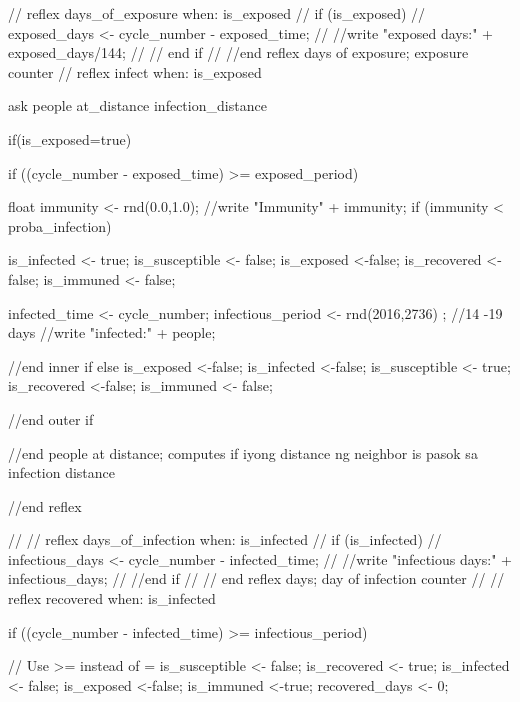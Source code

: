 \begin{verbatimtab}[4]
{{    //		reflex days_of_exposure when: is_exposed {
    //			if (is_exposed){
    //		   		exposed_days <- cycle_number - exposed_time;
    //		   		//write "exposed days:" + exposed_days/144;
    //		   	}// end if	
    //		}//end reflex days of exposure; exposure counter 
    //			
            reflex infect when: is_exposed {
                ask people at_distance infection_distance {
                    if(is_exposed=true){
                        if ((cycle_number - exposed_time) >= exposed_period){
                        float immunity <- rnd(0.0,1.0);
                        //write "Immunity" + immunity;
                        if (immunity < proba_infection) {
                            is_infected <- true;
                            is_susceptible <- false;
                            is_exposed <-false;
                            is_recovered <-false;
                            is_immuned <- false;
                            
                            infected_time <- cycle_number;
                            infectious_period <- rnd(2016,2736) ; //14 -19  days
                            //write "infected:" + people;
                        }//end inner if
                        else {
                            is_exposed <-false;
                            is_infected <-false;
                            is_susceptible <- true;
                            is_recovered <-false;
                            is_immuned <- false; 
                        }
                    }//end outer if	
                    }
                    
                    
                }//end people at distance;
                 computes if iyong distance ng neighbor is pasok sa infection distance 
            } //end reflex
            
    //		   
    //		reflex days_of_infection when: is_infected {
    //			if (is_infected){
    //				infectious_days <- cycle_number - infected_time;
    //		   		//write "infectious days:" + infectious_days;
    //		   	} //end if
    //		}// end reflex days; day of infection counter
    //	
    //	
            reflex recovered when: is_infected {
                if ((cycle_number - infected_time) >= infectious_period) {  
                	// Use >= instead of =
                    is_susceptible <- false;
                    is_recovered <- true;
                    is_infected <- false;
                    is_exposed <-false;
                    is_immuned <-true;
                    recovered_days <- 0;
                        
}}}}
\end{verbatimtab}
